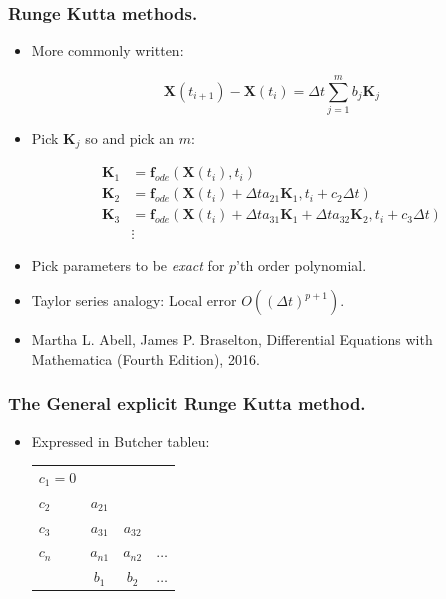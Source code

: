\documentclass{beamer}
\begin{document}
\begin{frame}
\frametitle{Runge Kutta methods.}
\begin{itemize}

\item<1-> More commonly written:

\begin{equation*}
\mathbf{X}(t_{i+1})-\mathbf{X}(t_{i}) =  \Delta t \sum_{j=1}^{m} b_j \mathbf{K}_j
\end{equation*}

\item<2-> Pick $\mathbf{K}_j$ so and pick an $m$:

\begin{align*}
\mathbf{K}_1 &= \mathbf{f}_{ode}(\mathbf{X}(t_i),t_i)\\
\mathbf{K}_2 &= \mathbf{f}_{ode}(\mathbf{X}(t_i)+\Delta ta_{21} \mathbf{K}_1,t_i+c_2 \Delta t)\\
\mathbf{K}_3 &= \mathbf{f}_{ode}(\mathbf{X}(t_i)+\Delta ta_{31} \mathbf{K}_1+\Delta ta_{32} \mathbf{K}_2,t_i+c_3 \Delta t)\\
&\vdots
\end{align*}

\item<3-> Pick parameters to be \textit{exact} for $p$'th order polynomial.

\item<4-> Taylor series analogy: Local error  $O((\Delta t)^{p+1})$.

\item<1-> {{\color{gray} Martha L. Abell, James P. Braselton, Differential Equations with Mathematica (Fourth Edition), 2016}}.
\end{itemize}
\end{frame}


\begin{frame}
\frametitle{The General explicit Runge Kutta method.}
\begin{itemize}


\item<1-> Expressed in Butcher tableu:

\begin{tabular}{l | @{\quad} c @{\quad} c @{\quad} c}
$c_1=0$ \\
$c_2$ & $a_{21}$\\
$c_3$ & $a_{31}$ &  $a_{32}$\\
$c_n$ & $a_{n1}$ &  $a_{n2}$ & $\hdots$\\
\midrule
& $b_1$ & $b_2$ & $\hdots$
\end{tabular}
\end{itemize}
\end{frame}
\end{document}
